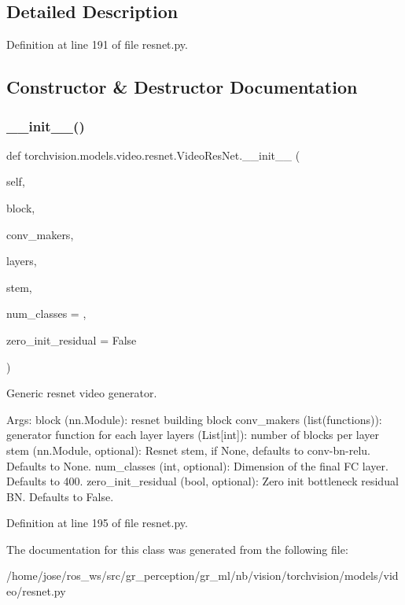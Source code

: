 \subsection{Detailed Description}


Definition at line 191 of file resnet.\+py.



\subsection{Constructor \& Destructor Documentation}
\mbox{\label{classtorchvision_1_1models_1_1video_1_1resnet_1_1VideoResNet_a365c99fb8fa26d93079b16843a6f0c36}} 
\subsubsection{\texorpdfstring{\+\_\+\+\_\+init\+\_\+\+\_\+()}{\_\_init\_\_()}}
{\footnotesize\ttfamily def torchvision.\+models.\+video.\+resnet.\+Video\+Res\+Net.\+\_\+\+\_\+init\+\_\+\+\_\+ (\begin{DoxyParamCaption}\item[{}]{self,  }\item[{}]{block,  }\item[{}]{conv\+\_\+makers,  }\item[{}]{layers,  }\item[{}]{stem,  }\item[{}]{num\+\_\+classes = {},  }\item[{}]{zero\+\_\+init\+\_\+residual = {\ttfamily False} }\end{DoxyParamCaption})}

\begin{DoxyVerb}Generic resnet video generator.

Args:
    block (nn.Module): resnet building block
    conv_makers (list(functions)): generator function for each layer
    layers (List[int]): number of blocks per layer
    stem (nn.Module, optional): Resnet stem, if None, defaults to conv-bn-relu. Defaults to None.
    num_classes (int, optional): Dimension of the final FC layer. Defaults to 400.
    zero_init_residual (bool, optional): Zero init bottleneck residual BN. Defaults to False.
\end{DoxyVerb}
 

Definition at line 195 of file resnet.\+py.



The documentation for this class was generated from the following file\+:\begin{DoxyCompactItemize}
\item 
/home/jose/ros\+\_\+ws/src/gr\+\_\+perception/gr\+\_\+ml/nb/vision/torchvision/models/video/resnet.\+py\end{DoxyCompactItemize}
